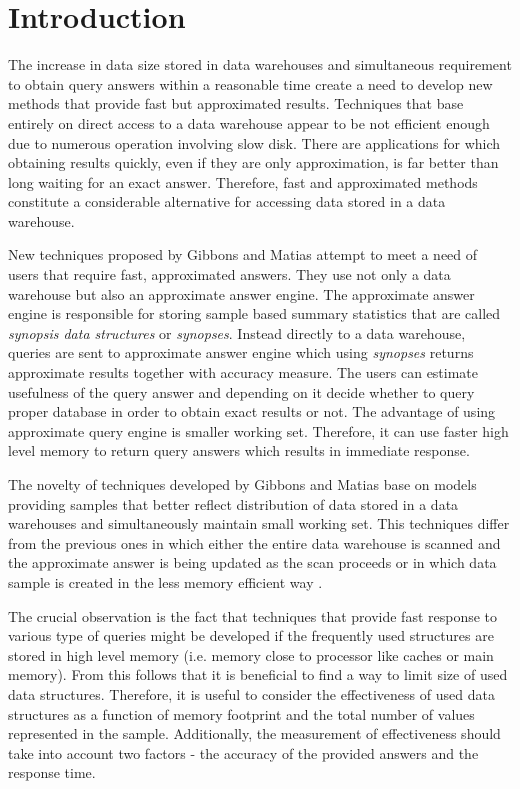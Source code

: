 \section{Introduction}
The increase in data size stored in data warehouses and simultaneous
requirement to obtain query answers within a reasonable time create a
need to develop new methods that provide fast but approximated
results. Techniques that base entirely on direct access to a data
warehouse appear to be not efficient enough due to numerous
operation involving slow disk. There are applications
for which obtaining results quickly, even if they are only
approximation, is far better than long waiting for an exact
answer. Therefore, fast and approximated methods
constitute a considerable alternative for accessing data stored in a
data warehouse.

New techniques proposed by Gibbons and Matias \cite{GM98} attempt to meet a
need of users that require fast, approximated answers. They use not
only a data warehouse but also an approximate answer engine.
The approximate answer engine is responsible for storing
sample based summary statistics that are called \textit{synopsis data
  structures} or \textit{synopses}. Instead
directly to a data warehouse, queries are sent to approximate answer
engine which using \textit{synopses} returns approximate results
together with accuracy measure.
The users can estimate usefulness of the query answer and depending on it
decide whether to query proper database in order to obtain exact results or not.
The advantage of using approximate query engine is smaller working set.
Therefore, it can use faster high level memory to return query answers
which results in immediate response.

The novelty of techniques developed by Gibbons and Matias
\cite{GM98} base on models providing samples
that better reflect distribution of
data stored in a data warehouses and simultaneously maintain small working set.
This techniques differ from the previous ones in which either the
entire data warehouse is scanned and the approximate answer is being updated as
the scan proceeds \cite{HHW97} or in which data sample is created in the less
memory efficient way \cite{Vit85}.

The crucial observation is the fact that techniques that provide
fast response to various type of queries might be developed if the
frequently used structures are stored in high level memory
(i.e. memory close to processor like caches or main memory). From this follows
that it is beneficial to find a way to limit size of used data structures. Therefore,
it is useful to consider the effectiveness of used data structures
as a function of memory footprint and the total number of values represented
in the sample. Additionally, the measurement of effectiveness
should take into account two factors - the
accuracy of the provided answers and the response time.

